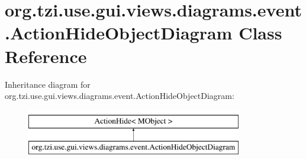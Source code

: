 \hypertarget{classorg_1_1tzi_1_1use_1_1gui_1_1views_1_1diagrams_1_1event_1_1_action_hide_object_diagram}{\section{org.\-tzi.\-use.\-gui.\-views.\-diagrams.\-event.\-Action\-Hide\-Object\-Diagram Class Reference}
\label{classorg_1_1tzi_1_1use_1_1gui_1_1views_1_1diagrams_1_1event_1_1_action_hide_object_diagram}
}
Inheritance diagram for org.\-tzi.\-use.\-gui.\-views.\-diagrams.\-event.\-Action\-Hide\-Object\-Diagram\-:\begin{figure}[H]
\begin{center}
\leavevmode
\includegraphics[height=2.000000cm]{classorg_1_1tzi_1_1use_1_1gui_1_1views_1_1diagrams_1_1event_1_1_action_hide_object_diagram}
\end{center}
\end{figure}
